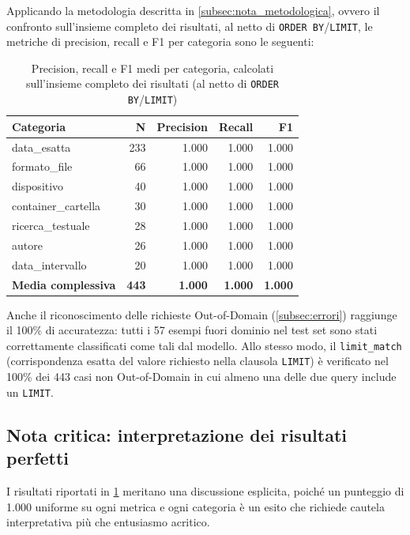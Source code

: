 \documentclass[12pt,a4paper,oneside]{book}
\newcommand{\code}[1]{\colorbox{light-gray}{\texttt{#1}}}
\begin{document}
Applicando la metodologia descritta in \cref{subsec:nota_metodologica}, ovvero il confronto sull'insieme completo dei risultati, al netto di \code{ORDER BY}/\code{LIMIT}, le metriche di precision, recall e F1 per categoria sono le seguenti:

\begin{table}[ht]
\centering
\begin{tabular}{lrrrr}
\toprule
Categoria & N & Precision & Recall & F1 \\
\midrule
data\_esatta        & 233 & 1.000 & 1.000 & 1.000 \\
formato\_file       & 66  & 1.000 & 1.000 & 1.000 \\
dispositivo         & 40  & 1.000 & 1.000 & 1.000 \\
container\_cartella & 30  & 1.000 & 1.000 & 1.000 \\
ricerca\_testuale   & 28  & 1.000 & 1.000 & 1.000 \\
autore              & 26  & 1.000 & 1.000 & 1.000 \\
data\_intervallo    & 20  & 1.000 & 1.000 & 1.000 \\
\midrule
\textbf{Media complessiva} & \textbf{443} & \textbf{1.000} & \textbf{1.000} & \textbf{1.000} \\
\bottomrule
\end{tabular}
\caption{Precision, recall e F1 medi per categoria, calcolati sull'insieme completo dei risultati (al netto di \code{ORDER BY}/\code{LIMIT})}\label{tab:metriche_categoria}
\end{table}

Anche il riconoscimento delle richieste Out-of-Domain (\cref{subsec:errori}) raggiunge il 100\% di accuratezza: tutti i 57 esempi fuori dominio nel test set sono stati correttamente classificati come tali dal modello. Allo stesso modo, il \code{limit\_match} (corrispondenza esatta del valore richiesto nella clausola \code{LIMIT}) è verificato nel 100\% dei 443 casi non Out-of-Domain in cui almeno una delle due query include un \code{LIMIT}.

\subsection{Nota critica: interpretazione dei risultati perfetti}\label{subsec:nota_critica}

I risultati riportati in \cref{tab:metriche_categoria} meritano una discussione esplicita, poiché un punteggio di 1.000 uniforme su ogni metrica e ogni categoria è un esito che richiede cautela interpretativa più che entusiasmo acritico.
\end{document}
